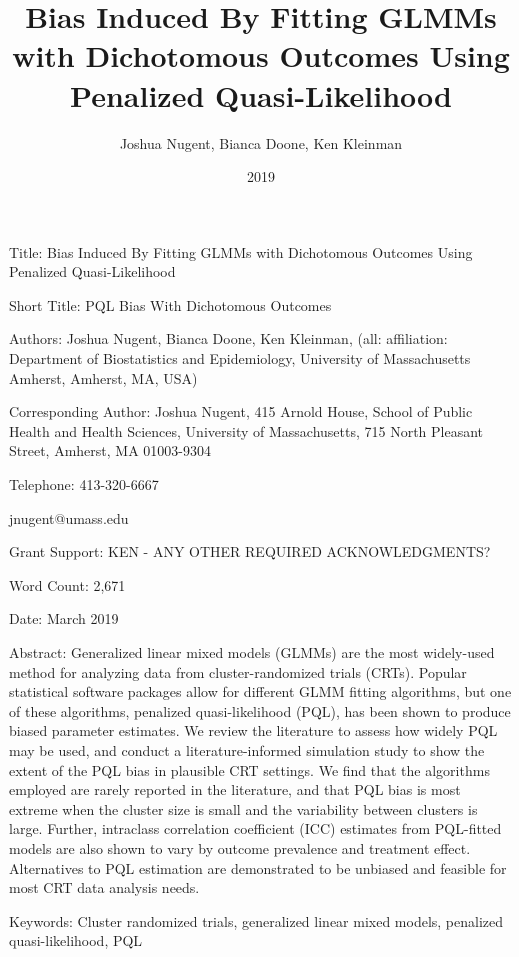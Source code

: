 \documentclass{article}
\begin{document}
\title{Bias Induced By Fitting GLMMs with Dichotomous Outcomes Using Penalized Quasi-Likelihood}
\author{Joshua Nugent, Bianca Doone, Ken Kleinman}
\date{2019}


Title: Bias Induced By Fitting GLMMs with Dichotomous Outcomes Using Penalized Quasi-Likelihood

Short Title: PQL Bias With Dichotomous Outcomes

Authors: Joshua Nugent, Bianca Doone, Ken Kleinman, (all: affiliation: Department of Biostatistics and Epidemiology, University of Massachusetts Amherst, Amherst, MA, USA)

Corresponding Author:
Joshua Nugent, 415 Arnold House, School of Public Health and Health Sciences, University of Massachusetts, 715 North Pleasant Street, Amherst, MA 01003-9304

Telephone: 413-320-6667

jnugent@umass.edu

Grant Support: KEN - ANY OTHER REQUIRED ACKNOWLEDGMENTS?

Word Count: 2,671

Date: March 2019

\newpage

Abstract: Generalized linear mixed models (GLMMs) are the most widely-used method for analyzing data from cluster-randomized trials (CRTs). Popular statistical software packages allow for different GLMM fitting algorithms, but one of these algorithms, penalized quasi-likelihood (PQL), has been shown to produce biased parameter estimates. We review the literature to assess how widely PQL may be used, and conduct a literature-informed simulation study to show the extent of the PQL bias in plausible CRT settings. We find that the algorithms employed are rarely reported in the literature, and that PQL bias is most extreme when the cluster size is small and the variability between clusters is large. Further, intraclass correlation coefficient (ICC) estimates from PQL-fitted models are also shown to vary by outcome prevalence and treatment effect. Alternatives to PQL estimation are demonstrated to be unbiased and feasible for most CRT data analysis needs.


Keywords: Cluster randomized trials, generalized linear mixed models, penalized quasi-likelihood, PQL
\end{document}
